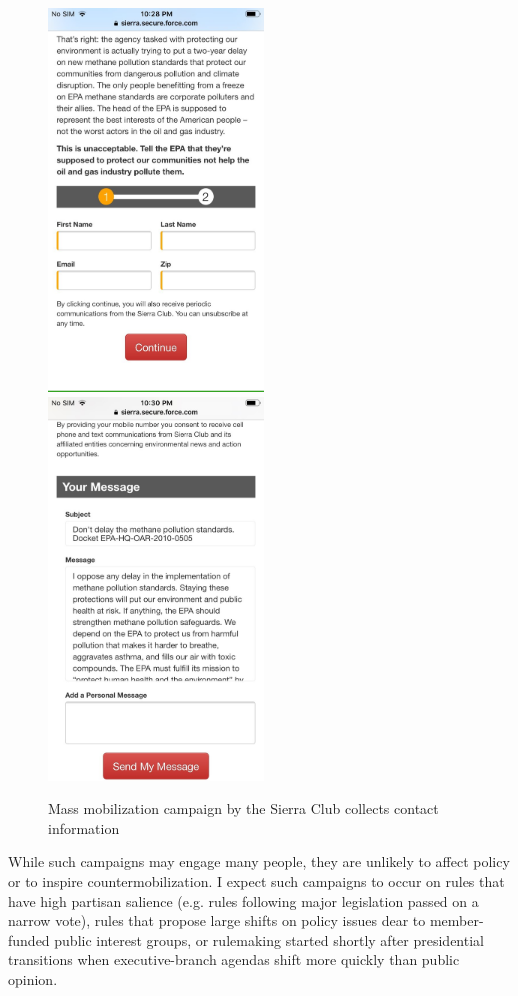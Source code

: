 \begin{subhyp}
\begin{figure}
    \caption{Mass mobilization campaign by the Sierra Club collects contact information}
    \centering
    \includegraphics[height = 4in]{Figs/sierra1.jpeg}
    \includegraphics[height = 4in]{Figs/sierra2.jpeg}
    \label{fig:sierra}
\end{figure}

While such campaigns may engage many people, they are unlikely to affect policy or to inspire countermobilization. I expect such campaigns to occur on rules that have high partisan salience (e.g. rules following major legislation passed on a narrow vote), rules that propose large shifts on policy issues dear to member-funded public interest groups, or rulemaking started shortly after presidential transitions when executive-branch agendas shift more quickly than public opinion.


\end{subhyp}

